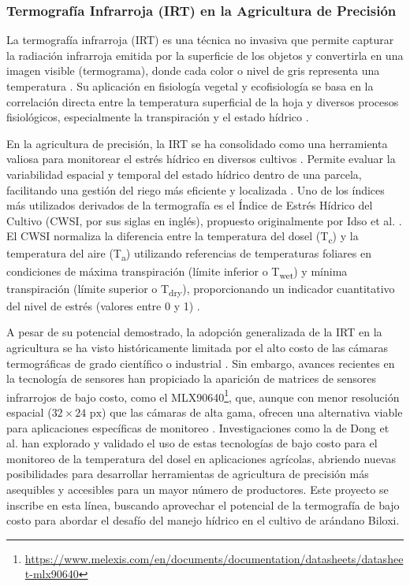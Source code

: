 \subsubsection{Termografía Infrarroja (IRT) en la Agricultura de Precisión}
\label{ssubsec:termografia}

La termografía infrarroja (IRT) es una técnica no invasiva que permite capturar la radiación infrarroja emitida por la superficie de los objetos y convertirla en una imagen visible (termograma), donde cada color o nivel de gris representa una temperatura . Su aplicación en fisiología vegetal y ecofisiología se basa en la correlación directa entre la temperatura superficial de la hoja y diversos procesos fisiológicos, especialmente la transpiración y el estado hídrico .

En la agricultura de precisión, la IRT se ha consolidado como una herramienta valiosa para monitorear el estrés hídrico en diversos cultivos . Permite evaluar la variabilidad espacial y temporal del estado hídrico dentro de una parcela, facilitando una gestión del riego más eficiente y localizada . Uno de los índices más utilizados derivados de la termografía es el Índice de Estrés Hídrico del Cultivo (CWSI, por sus siglas en inglés), propuesto originalmente por Idso et al. . El CWSI normaliza la diferencia entre la temperatura del dosel (T\textsubscript{c}) y la temperatura del aire (T\textsubscript{a}) utilizando referencias de temperaturas foliares en condiciones de máxima transpiración (límite inferior o T\textsubscript{wet}) y mínima transpiración (límite superior o T\textsubscript{dry}), proporcionando un indicador cuantitativo del nivel de estrés (valores entre 0 y 1) .

A pesar de su potencial demostrado, la adopción generalizada de la IRT en la agricultura se ha visto históricamente limitada por el alto costo de las cámaras termográficas de grado científico o industrial . Sin embargo, avances recientes en la tecnología de sensores han propiciado la aparición de matrices de sensores infrarrojos de bajo costo, como el MLX90640\footnote{\url{https://www.melexis.com/en/documents/documentation/datasheets/datasheet-mlx90640}}, que, aunque con menor resolución espacial ($32 \times 24\text{ px}$) que las cámaras de alta gama, ofrecen una alternativa viable para aplicaciones específicas de monitoreo . Investigaciones como la de Dong et al.  han explorado y validado el uso de estas tecnologías de bajo costo para el monitoreo de la temperatura del dosel en aplicaciones agrícolas, abriendo nuevas posibilidades para desarrollar herramientas de agricultura de precisión más asequibles y accesibles para un mayor número de productores. Este proyecto se inscribe en esta línea, buscando aprovechar el potencial de la termografía de bajo costo para abordar el desafío del manejo hídrico en el cultivo de arándano Biloxi.

